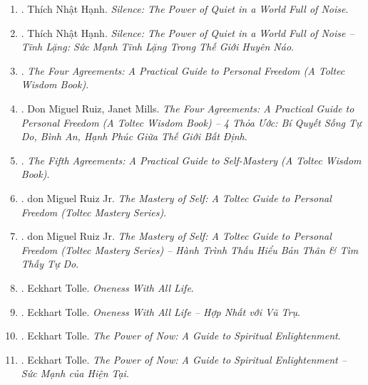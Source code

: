 \documentclass{article}
\begin{document}
\begin{enumerate}
	\item \cite{Hanh_silence}. {\sc Thích Nhật Hạnh}. {\it Silence: The Power of Quiet in a World Full of Noise}.
	
	\item \cite{Hanh_silence_VN}. {\sc Thích Nhật Hạnh}. {\it Silence: The Power of Quiet in a World Full of Noise -- Tĩnh Lặng: Sức Mạnh Tĩnh Lặng Trong Thế Giới Huyên Náo}.\hfill{\sf[done]}
	
	\item \cite{Ruiz_4_agreements}. {\it The Four Agreements: A Practical Guide to Personal Freedom (A Toltec Wisdom Book)}.\hfill{\sf[done]}
	
	\item \cite{Ruiz_Mills_4_agreements_VN}. Don Miguel Ruiz, Janet Mills. {\it The Four Agreements: A Practical Guide to Personal Freedom (A Toltec Wisdom Book) -- 4 Thỏa Ước: Bí Quyết Sống Tự Do, Bình An, Hạnh Phúc Giữa Thế Giới Bất Định}.\hfill{\sf[done]}
	
	\item \cite{Ruiz_Ruiz_5th_agreement}. {\it The Fifth Agreements: A Practical Guide to Self-Mastery (A Toltec Wisdom Book)}.\hfill{\sf[done]}
	
	\item \cite{Ruiz_mastery_self}. {\sc don Miguel Ruiz Jr.} {\it The Mastery of Self: A Toltec Guide to Personal Freedom (Toltec Mastery Series)}.
	
	\item \cite{Ruiz_mastery_self_VN}. {\sc don Miguel Ruiz Jr.} {\it The Mastery of Self: A Toltec Guide to Personal Freedom (Toltec Mastery Series) -- Hành Trình Thấu Hiểu Bản Thân \& Tìm Thấy Tự Do}.\hfill{\sf[done]}
	
	\item \cite{Tolle_oneness}. {\sc Eckhart Tolle}. {\it Oneness With All Life}.
	
	\item \cite{Tolle_oneness_VN}. {\sc Eckhart Tolle}. {\it Oneness With All Life -- Hợp Nhất với Vũ Trụ}.\hfill{\sf[done]}
	
	\item \cite{Tolle_now}. {\sc Eckhart Tolle}. {\it The Power of Now: A Guide to Spiritual Enlightenment}.
	
	\item \cite{Tolle_now_VN}. {\sc Eckhart Tolle}. {\it The Power of Now: A Guide to Spiritual Enlightenment -- Sức Mạnh của Hiện Tại}.\hfill{\sf[done]}
	

\end{enumerate}
\end{document}
